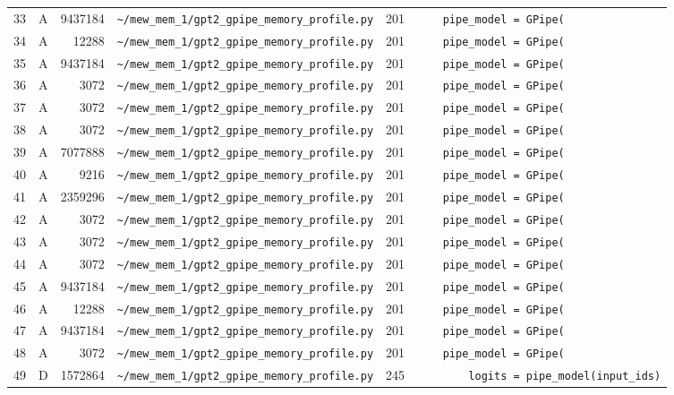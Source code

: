 \documentclass{article}
\begin{document}
\begin{longtable}{r l r p{6.5cm} r p{7.0cm}}
33 & A & 9437184 & \lstinline|~/mew_mem_1/gpt2_gpipe_memory_profile.py| & 201 & \lstinline|    pipe_model = GPipe(| \\
34 & A & 12288 & \lstinline|~/mew_mem_1/gpt2_gpipe_memory_profile.py| & 201 & \lstinline|    pipe_model = GPipe(| \\
35 & A & 9437184 & \lstinline|~/mew_mem_1/gpt2_gpipe_memory_profile.py| & 201 & \lstinline|    pipe_model = GPipe(| \\
36 & A & 3072 & \lstinline|~/mew_mem_1/gpt2_gpipe_memory_profile.py| & 201 & \lstinline|    pipe_model = GPipe(| \\
37 & A & 3072 & \lstinline|~/mew_mem_1/gpt2_gpipe_memory_profile.py| & 201 & \lstinline|    pipe_model = GPipe(| \\
38 & A & 3072 & \lstinline|~/mew_mem_1/gpt2_gpipe_memory_profile.py| & 201 & \lstinline|    pipe_model = GPipe(| \\
39 & A & 7077888 & \lstinline|~/mew_mem_1/gpt2_gpipe_memory_profile.py| & 201 & \lstinline|    pipe_model = GPipe(| \\
40 & A & 9216 & \lstinline|~/mew_mem_1/gpt2_gpipe_memory_profile.py| & 201 & \lstinline|    pipe_model = GPipe(| \\
41 & A & 2359296 & \lstinline|~/mew_mem_1/gpt2_gpipe_memory_profile.py| & 201 & \lstinline|    pipe_model = GPipe(| \\
42 & A & 3072 & \lstinline|~/mew_mem_1/gpt2_gpipe_memory_profile.py| & 201 & \lstinline|    pipe_model = GPipe(| \\
43 & A & 3072 & \lstinline|~/mew_mem_1/gpt2_gpipe_memory_profile.py| & 201 & \lstinline|    pipe_model = GPipe(| \\
44 & A & 3072 & \lstinline|~/mew_mem_1/gpt2_gpipe_memory_profile.py| & 201 & \lstinline|    pipe_model = GPipe(| \\
45 & A & 9437184 & \lstinline|~/mew_mem_1/gpt2_gpipe_memory_profile.py| & 201 & \lstinline|    pipe_model = GPipe(| \\
46 & A & 12288 & \lstinline|~/mew_mem_1/gpt2_gpipe_memory_profile.py| & 201 & \lstinline|    pipe_model = GPipe(| \\
47 & A & 9437184 & \lstinline|~/mew_mem_1/gpt2_gpipe_memory_profile.py| & 201 & \lstinline|    pipe_model = GPipe(| \\
48 & A & 3072 & \lstinline|~/mew_mem_1/gpt2_gpipe_memory_profile.py| & 201 & \lstinline|    pipe_model = GPipe(| \\
49 & D & 1572864 & \lstinline|~/mew_mem_1/gpt2_gpipe_memory_profile.py| & 245 & \lstinline|        logits = pipe_model(input_ids)| \\

\end{longtable}
\end{document}
